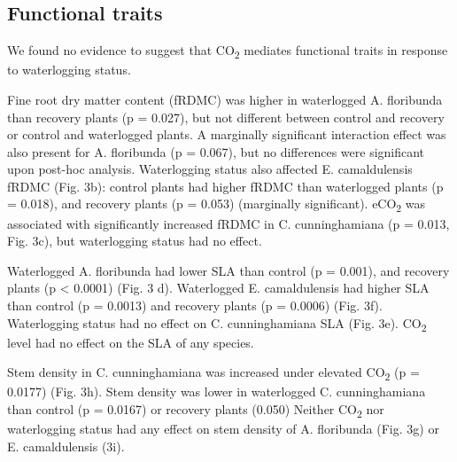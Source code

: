 \documentclass[12pt,a4paper]{memoir}
\begin{document}
\subsection*{Functional traits}
We found no evidence to suggest that CO\textsubscript{2} mediates functional traits in response to waterlogging status.

Fine root dry matter content (fRDMC) was higher in waterlogged A. floribunda than recovery plants (p = 0.027), but not different between control and recovery or control and waterlogged plants. A marginally significant interaction effect was also present for A. floribunda (p = 0.067), but no differences were significant upon post-hoc analysis. Waterlogging status also affected E. camaldulensis fRDMC (Fig. 3b): control plants had higher fRDMC than waterlogged plants (p = 0.018), and recovery plants (p = 0.053) (marginally significant). eCO\textsubscript{2} was associated with significantly increased fRDMC in C. cunninghamiana (p = 0.013, Fig. 3c), but waterlogging status had no effect.

Waterlogged A. floribunda had lower SLA than control (p = 0.001), and recovery plants (p < 0.0001) (Fig. 3 d). Waterlogged E. camaldulensis had higher SLA than control (p = 0.0013) and recovery plants (p = 0.0006) (Fig. 3f). Waterlogging status had no effect on C. cunninghamiana SLA (Fig. 3e). CO\textsubscript{2} level had no effect on the SLA of any species. 

Stem density in C. cunninghamiana was increased under elevated CO\textsubscript{2} (p = 0.0177) (Fig. 3h). Stem density was lower in waterlogged C. cunninghamiana than control (p = 0.0167) or recovery plants (0.050) Neither CO\textsubscript{2} nor waterlogging status had any effect on stem density of A. floribunda (Fig. 3g) or E. camaldulensis (3i).
\end{document}

